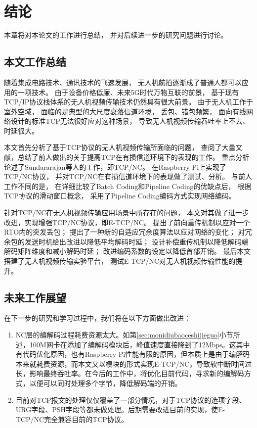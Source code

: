 \chapter*{结\qquad{}论}
本章将对本论文的工作进行总结，
并对后续进一步的研究问题进行讨论。
\section*{本文工作总结}
随着集成电路技术、通讯技术的飞速发展，
无人机航拍逐渐成了普通人都可以应用的一项技术。
由于设备价格低廉、未来5G时代万物互联的前景，
基于现有TCP/IP协议栈体系的无人机视频传输技术仍然具有很大前景。
由于无人机工作于室外空域，
面临的是典型的大尺度衰落信道环境，
丢包、错包频繁，
面向有线网络设计的标准TCP无法很好应对这种场景，
导致无人机视频传输吞吐率上不去、时延很大。
\par
本文首先分析了基于TCP协议的无人机视频传输所面临的问题，
查阅了大量文献，总结了前人做出的关于提高TCP在有损信道环境下的表现的工作。
重点分析论述了Sundararajan等人的工作，即TCP/NC。
在Raspberry Pi上实现了TCP/NC协议，
并对TCP/NC在有损信道环境下的表现做了测试、分析。
与前人工作不同的是，
在详细比较了Batch Coding和Pipeline Coding的优缺点后，
根据TCP协议的滑动窗口概念，
采用了Pipeline Coding编码方式实现网络编码。
\par
针对TCP/NC在无人机视频传输应用场景中所存在的问题，
本文对其做了进一步改进，实现增强TCP/NC协议，即E-TCP/NC。
提出了前向重传机制以应对一个RTO内的突发丢包；
提出了一种新的自适应冗余度算法以应对网络的变化；
对冗余包的发送时机给出改进以降低平均解码时延；
设计补偿重传机制以降低解码端解码矩阵维度和减小解码时延；
改进编码系数的设定以降低首部开销。
最后本文搭建了无人机视频传输实验平台，
测试E-TCP/NC对无人机视频传输性能的提升。

\section*{未来工作展望}
在下一步的研究和学习过程中，我们将在以下方面做出改进：
\begin{enumerate}[fullwidth,itemindent=2em,label=(\arabic*)]
	\item NC层的编解码过程耗费资源太大。如第\ref{sec:monidiubaoceshijieguo}小节所述，100M网卡在添加了编解码模块后，峰值速度直接降到了12Mbps。这其中有代码优化原因，也有Raspberry Pi性能有限的原因，但本质上是由于编解码本来就耗费资源，而本文又以模块的形式实现E-TCP/NC，导致软中断时间过长，影响最终吞吐率。在今后的工作中，将优化目前代码，寻求新的编解码方式，以便可以同时处理多个字节，降低解码端的开销。
	\item 目前对TCP报文的处理仅仅覆盖了一部分情况，对于TCP协议的选项字段、URG字段、PSH字段等都未做处理。后期需要改进目前的实现，使E-TCP/NC完全兼容目前的TCP协议。
\end{enumerate}